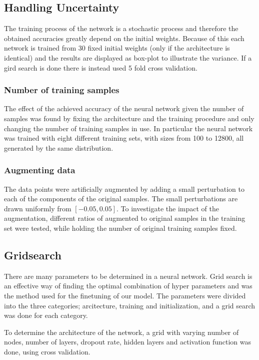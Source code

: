 \documentclass[prl,twocolumn]{revtex4-1}
\begin{document}
\subsection{Handling Uncertainty}
The training process of the network is a stochastic process and therefore the obtained accuracies greatly depend on the initial weights. Because of this each network is trained from 30 fixed initial weights (only if the architecture is identical) and the results are displayed as box-plot to illustrate the variance. If a gird search is done there is instead used 5 fold cross validation.

\subsubsection{Number of training samples}
The effect of the achieved accuracy of the neural network given the number of samples was found by fixing the architecture and the training procedure and only changing the number of training samples in use. In particular the neural network was trained with eight different training sets, with sizes from 100 to 12800, all generated by the same distribution.


\subsubsection{Augmenting data}
The data points were artificially augmented by adding a small perturbation to each of the components of the original samples. The small perturbations are drawn uniformly from $[-0.05,0.05]$. To investigate the impact of the augmentation, different ratios of augmented to original samples in the training set were tested, while holding the number of original training samples fixed.\\


\subsection{Gridsearch}
There are many parameters to be determined in a neural network. Grid search is an effective way of finding the optimal combination of hyper parameters and was the method used for the finetuning of our model. The parameters were divided into the three categories; arcitecture, training and initialization, and a grid search was done for each category.

To determine the architecture of the network, a grid with varying number of nodes, number of layers, dropout rate, hidden layers and activation function was done, using cross validation.
\end{document}
